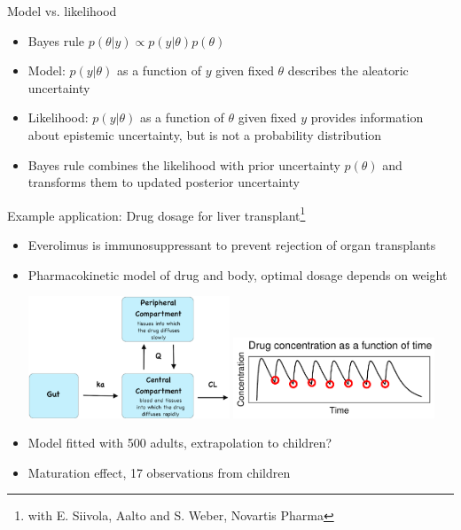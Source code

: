 \documentclass[10pt,handout]{beamer}
\begin{document}
\begin{frame}{Model vs. likelihood}

  \begin{itemize}
  \item Bayes rule
      $p(\theta|y)\propto p(y|\theta)p(\theta)$
    \vspace{\baselineskip}
  \item Model: $p(y|\theta)$ as a function of $y$ given fixed $\theta$
    describes the aleatoric uncertainty \vspace{\baselineskip}
  \item Likelihood: $p(y|\theta)$ %
    as a function of $\theta$
    given fixed $y$ provides information about epistemic uncertainty,
    but is not a probability distribution
    \vspace{\baselineskip}
  \item<2-> Bayes rule combines the likelihood with prior uncertainty
    $p(\theta)$ and transforms them to updated posterior uncertainty
  \end{itemize}
\end{frame}


\begin{frame}{Example application: Drug dosage for liver transplant\footnote{\color{gray}with E. Siivola, Aalto and S. Weber, Novartis Pharma}}

  \vspace{-0.5\baselineskip}
\begin{itemize}
\item Everolimus is immunosuppressant to prevent rejection of organ
  transplants
\item Pharmacokinetic model of drug and body, optimal dosage depends on weight\\
  \begin{minipage}[t]{\textwidth}
    \vspace{-.2\baselineskip}
  \hspace{-1.2cm}\includegraphics[width=6cm]{figs/2compartment_graph.png}
  \includegraphics[width=6cm]{figs/data_population_simple.pdf}
\end{minipage}
    \vspace{.2\baselineskip}
\item<2-> Model fitted with 500 adults, extrapolation to children?
\item<3-> Maturation effect, 17 observations from children
\end{itemize}

\end{frame}
\end{document}
